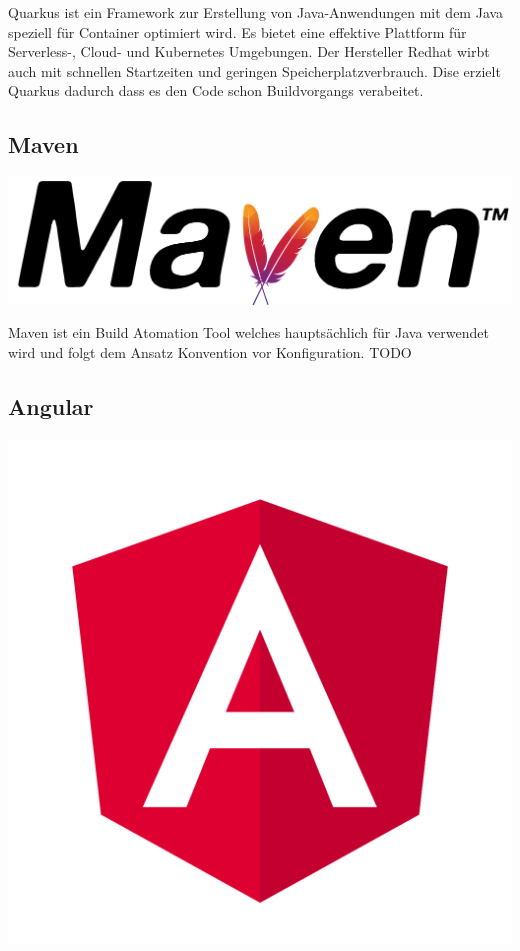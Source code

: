 Quarkus ist ein Framework zur Erstellung von Java-Anwendungen mit dem Java speziell für Container optimiert wird. 
Es bietet eine effektive Plattform für Serverless-, Cloud- und Kubernetes Umgebungen. Der Hersteller Redhat wirbt 
auch mit schnellen Startzeiten und geringen Speicherplatzverbrauch. Dise erzielt Quarkus dadurch dass es den Code schon Buildvorgangs verabeitet.

\subsection{Maven}
\includegraphics[scale=0.015]{pics/apacheMavenLogo.svg.png}

Maven ist ein Build Atomation Tool welches hauptsächlich für Java verwendet wird und folgt dem Ansatz Konvention vor Konfiguration. TODO


\subsection{Angular}
\includegraphics[scale=0.02]{pics/angularLogo.svg.png}

